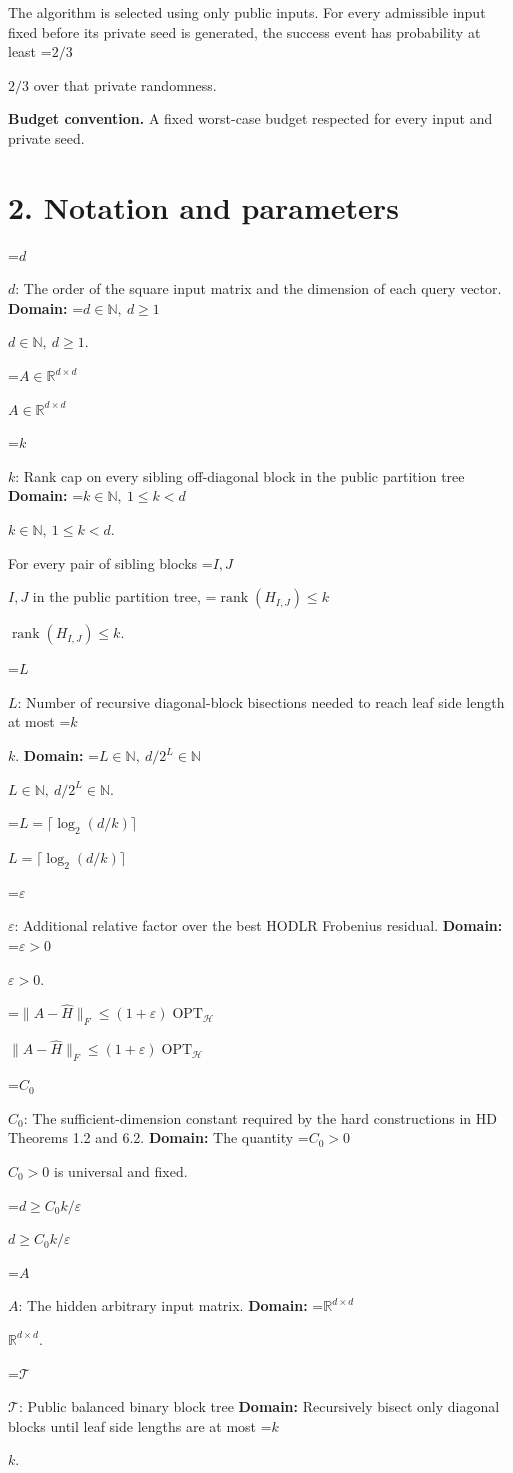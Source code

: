 \documentclass[10pt,a4paper]{article}
\newcommand{\AtlasMath}[1]{\par\begingroup\centering\setbox0=\hbox{$\displaystyle #1$}\ifdim\wd0>1.4\linewidth\typeout{ATLAS WIDE FORMULA: \the\wd0}\fi\ifdim\wd0>\linewidth\resizebox{\linewidth}{!}{\box0}\else\box0\fi\par\endgroup}
\newcommand{\AtlasInlineMath}[1]{\begingroup\setbox0=\hbox{$#1$}\ifdim\wd0>.4\linewidth\endgroup\AtlasMath{#1}\else\endgroup$#1$\fi}
\begin{document}
The algorithm is selected using only public inputs. For every admissible input fixed before its private seed is generated, the success event has probability at least \AtlasInlineMath{2/3} over that private randomness.

\textbf{Budget convention.} A fixed worst-case budget respected for every input and private seed.

\section{2. Notation and parameters}
\AtlasInlineMath{d}: The order of the square input matrix and the dimension of each query vector. \textbf{Domain:} \AtlasInlineMath{d\in\mathbb N,\ d\ge1}.

\AtlasInlineMath{A\in\mathbb R^{d\times d}}

\AtlasInlineMath{k}: Rank cap on every sibling off-diagonal block in the public partition tree \textbf{Domain:} \AtlasInlineMath{k\in\mathbb N,\ 1\le k<d}.

For every pair of sibling blocks \AtlasInlineMath{I,J} in the public partition tree, \AtlasInlineMath{\operatorname{rank}(H_{I,J})\le k}.

\AtlasInlineMath{L}: Number of recursive diagonal-block bisections needed to reach leaf side length at most \AtlasInlineMath{k}. \textbf{Domain:} \AtlasInlineMath{L\in\mathbb N,\ d/2^L\in\mathbb N}.

\AtlasInlineMath{L=\lceil\log_2(d/k)\rceil}

\AtlasInlineMath{\varepsilon}: Additional relative factor over the best HODLR Frobenius residual. \textbf{Domain:} \AtlasInlineMath{\varepsilon>0}.

\AtlasInlineMath{\|A-\widehat H\|_F\le(1+\varepsilon)\operatorname{OPT}_{\mathcal H}}

\AtlasInlineMath{C_0}: The sufficient-dimension constant required by the hard constructions in HD Theorems 1.2 and 6.2. \textbf{Domain:} The quantity \AtlasInlineMath{C_0>0} is universal and fixed.

\AtlasInlineMath{d\ge C_0k/\varepsilon}

\AtlasInlineMath{A}: The hidden arbitrary input matrix. \textbf{Domain:} \AtlasInlineMath{\mathbb R^{d\times d}}.

\AtlasInlineMath{\mathcal T}: Public balanced binary block tree \textbf{Domain:} Recursively bisect only diagonal blocks until leaf side lengths are at most \AtlasInlineMath{k}.
\end{document}
